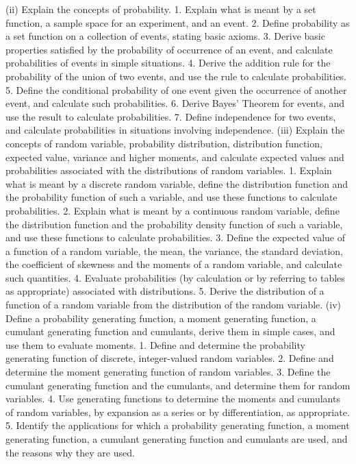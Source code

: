 (ii) Explain the concepts of probability.  
 1. Explain what is meant by a set function, a sample space for an experiment, and an event.  
 2. Define probability as a set function on a collection of events, stating basic axioms.  
 3. Derive basic properties satisfied by the probability of occurrence of an event, and calculate probabilities of events in simple situations.  
 4. Derive the addition rule for the probability of the union of two events, and use the rule to calculate probabilities.  
 5. Define the conditional probability of one event given the occurrence of another event, and calculate such probabilities.  
 6. Derive Bayes’ Theorem for events, and use the result to calculate probabilities.  
 7. Define independence for two events, and calculate probabilities in situations involving independence.  
(iii) Explain the concepts of random variable, probability distribution, distribution function, expected value, variance and higher moments, and calculate expected values and probabilities associated with the distributions of random variables.  
 1. Explain what is meant by a discrete random variable, define the distribution function and the probability function of such a variable, and use these functions to calculate probabilities.  
 2. Explain what is meant by a continuous random variable, define the distribution function and the probability density function of such a variable, and use these functions to calculate probabilities.  
 3. Define the expected value of a function of a random variable, the mean, the variance, the standard deviation, the coefficient of skewness and the moments of a random variable, and calculate such quantities.  
 4. Evaluate probabilities (by calculation or by referring to tables as appropriate) associated with distributions.  
 5. Derive the distribution of a function of a random variable from the distribution of the random variable.  
(iv) Define a probability generating function, a moment generating function, a cumulant generating function and cumulants, derive them in simple cases, and use them to evaluate moments.  
 1. Define and determine the probability generating function of discrete, integer-valued random variables.  
 2. Define and determine the moment generating function of random variables.  
 3. Define the cumulant generating function and the cumulants, and determine them for random variables.  
 4. Use generating functions to determine the moments and cumulants of random variables, by expansion as a series or by differentiation, as appropriate.  5. Identify the applications for which a probability generating function, a moment generating function, a cumulant generating function and cumulants are used, and the reasons why they are used.  

